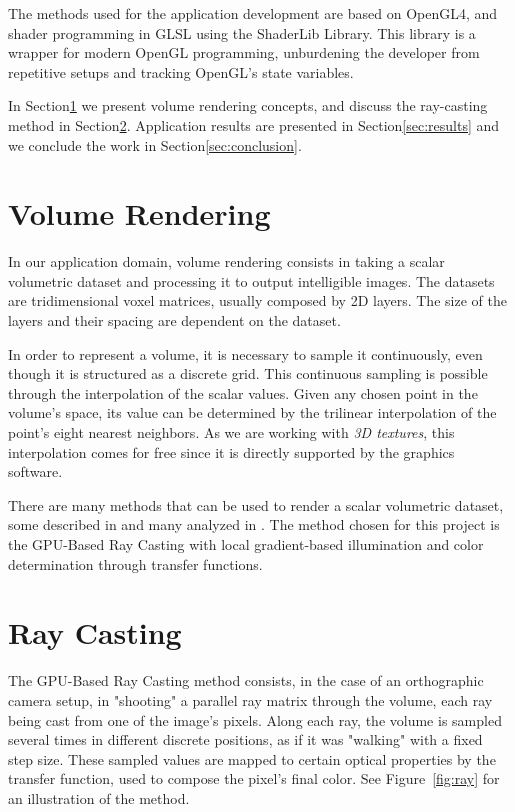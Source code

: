 \documentclass[10pt, conference]{IEEEtran}
\begin{document}
The methods used for the application development are based on OpenGL4, and shader programming in GLSL using the ShaderLib Library\cite{shaderlib}. This library is a wrapper for modern OpenGL programming, unburdening the developer from repetitive setups and tracking OpenGL's state variables.

In Section\ref{sec:volrender} we present volume rendering concepts, and discuss the ray-casting method in Section\ref{sec:raycasting}. Application results are presented in Section\ref{sec:results} and we conclude the work in Section\ref{sec:conclusion}.

\section{Volume Rendering}
\label{sec:volrender}

In our application domain, volume rendering consists in taking a scalar volumetric dataset and processing it to output intelligible images. The datasets are tridimensional voxel matrices, usually composed by 2D layers. The size of the layers and their spacing are dependent on the dataset.


In order to represent a volume, it is necessary to sample it continuously, even though it is structured as a discrete grid. This continuous sampling is possible through the interpolation of the scalar values. Given any chosen point in the volume's space, its value can be determined by the trilinear interpolation of the point's eight nearest neighbors. As we are working with \textit{3D textures}, this interpolation comes for free since it is directly supported by the graphics software.


There are many methods that can be used to render a scalar volumetric dataset, some described in \cite{RTVR} and many analyzed in \cite{survey}. The method chosen for this project is the GPU-Based Ray Casting with local gradient-based illumination and color determination through transfer functions.



\section{Ray Casting}
\label{sec:raycasting}

The GPU-Based Ray Casting method consists, in the case of an orthographic camera setup, in "shooting" a parallel ray matrix through the volume, each ray being cast from one of the image's pixels. Along each ray, the volume is sampled several times in different discrete positions, as if it was "walking" with a fixed step size. These sampled values are mapped to certain optical properties by the transfer function, used to compose the pixel's final color. See Figure~\ref{fig:ray} for an illustration of the method.
\end{document}
